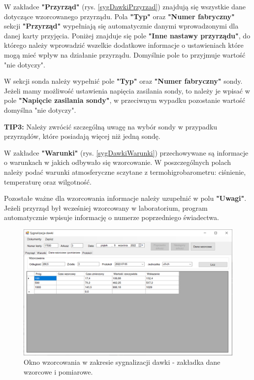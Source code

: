 	W zakładce \textbf{"Przyrząd"} (rys. \ref{sygDawkiPrzyrzad}) znajdują się wszystkie dane dotyczące wzorcowanego przyrządu. Pola \textbf{"Typ"} oraz \textbf{"Numer fabryczny"} sekcji \textbf{"Przyrząd"} wypełniają się automatycznie danymi wprowadzonymi dla danej karty przyjęcia. Poniżej znajduje się pole \textbf{"Inne nastawy przyrządu"}, do którego należy wprowadzić wszelkie dodatkowe informacje o ustawieniach które mogą mieć wpływ na działanie przyrządu. Domyślnie pole to przyjmuje wartość "nie dotyczy".
	
	W sekcji sonda należy wypełnić pole \textbf{"Typ"} oraz \textbf{"Numer fabryczny"} sondy. Jeżeli mamy możliwość ustawienia napięcia zasilania sondy, to należy je wpisać w pole \textbf{"Napięcie zasilania sondy"}, w przeciwnym wypadku pozostanie wartość domyślna "nie dotyczy".
	
	\textbf{TIP3:} Należy zwrócić szczególną uwagę na wybór sondy w przypadku przyrządów, które posiadają więcej niż jedną sondę.
	
	W zakładce \textbf{"Warunki"} (rys. \ref{sygDawkiWarunki}) przechowywane są informacje o warunkach w jakich odbywało się wzorcowanie. W poszczególnych polach należy podać warunki atmosferyczne sczytane z termohigrobarometru: ciśnienie, temperaturę oraz wilgotność.

	Pozostałe ważne dla wzorcowania informacje należy uzupełnić w polu \textbf{"Uwagi"}. Jeżeli przyrząd był wcześniej wzorcowany w laboratorium, program automatycznie wpisuje informację o numerze poprzedniego świadectwa. 
	
	\begin{figure}[htb]
		\centering
		\includegraphics[width=\columnwidth]{obrazki/Wzorcowanie/syg_dawki/dane.png}
		\caption{Okno wzorcowania w zakresie sygnalizacji dawki - zakładka dane wzorcowe i pomiarowe.}
		\label{sygDawkiDane}
	\end{figure}
	
